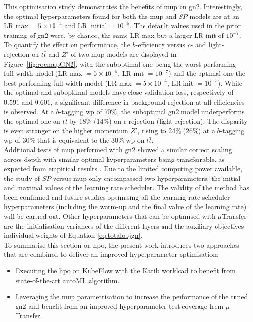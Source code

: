 This optimisation study demonstrates the benefits of \gls{mup} on \gls{gn2}. Interestingly, the optimal hyperparameters found for both the \gls{mup} and $SP$ models are at an LR max = $5 \times 10^{-4}$ and LR initial = $10^{-5}$. The default values used in the prior training of \gls{gn2} were, by chance, the same LR max but a larger LR init of $10^{-7}$. To quantify the effect on performance, the $b$-efficiency versus $c$- and light-rejection on $t\bar{t}$ and $Z'$ of two \gls{mup} models are displayed in Figure~\ref{fig:rocmupGN2}, with the suboptimal one being the worst-performing full-width model (LR max $= 5 \times 10^{-5}$, LR init $= 10^{-7}$) and the optimal one the best-performing full-width model (LR max $= 5\times 10^{-4}$, LR init $= 10^{-5}$). While the optimal and suboptimal models have close validation loss, respectively of $0.591$ and $0.601$, a significant difference in background rejection at all efficiencies is observed. At a $b$-tagging \gls{wp} of 70\%, the suboptimal \gls{gn2} model underperforms the optimal one on $t\bar{t}$ by 18\% (14\%) on $c$-rejection (light-rejection). The disparity is even stronger on the higher momentum $Z'$, rising to 24\% (26\%) at a $b$-tagging \gls{wp} of 30\% that is equivalent to the 30\% \gls{wp} on $t\bar{t}$. \\

Additional tests of \gls{mup} performed with \gls{gn2} showed a similar correct scaling across depth with similar optimal hyperparameters being transferrable, as expected from empirical results \cite{yang2021tuning}. Due to the limited computing power available, the study of $SP$ versus \gls{mup} only encompassed two hyperparameters: the initial and maximal values of the learning rate scheduler. The validity of the method has been confirmed and future studies optimising all the learning rate scheduler hyperparameters (including the warm-up and the final value of the learning rate) will be carried out. Other hyperparameters that can be optimised with $\mu$Transfer are the initialisation variances of the different layers and the auxiliary objectives individual weights of Equation \ref{eq:totalobjgn}. \\

To summarise this section on \gls{hpo}, the present work introduces two approaches that are combined to deliver an improved hyperparameter optimisation:
\begin{itemize}
  \item Executing the \gls{hpo} on KubeFlow with the Katib workload to benefit from state-of-the-art autoML algorithm.
  \item Leveraging the \gls{mup} parametrisation to increase the performance of the tuned \gls{gn2} and benefit from an improved hyperparameter test coverage from $\mu$Transfer.
\end{itemize}

